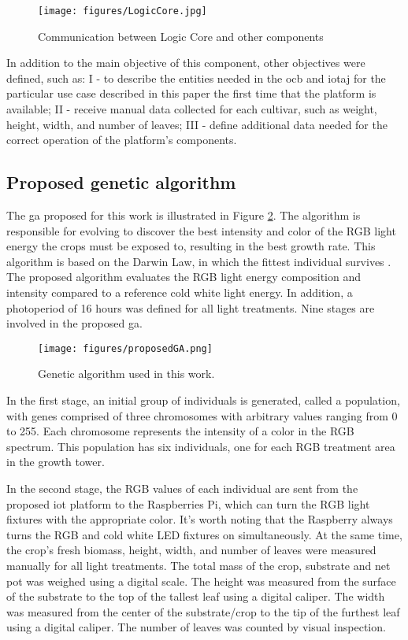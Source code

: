 \documentclass[preprint, review, 12pt]{elsarticle}
\begin{document}
\begin{figure}[htbp]
    \centering
    \texttt{[image: figures/LogicCore.jpg]}
    \caption{Communication between Logic Core and other components}
    \label{fig:logicCore}
\end{figure}

In addition to the main objective of this component, other objectives were defined, such as: I - to describe the entities needed in the \gls{ocb} and \gls{iotaj} for the particular use case described in this paper the first time that the platform is available; II - receive manual data collected for each cultivar, such as weight, height, width, and number of leaves; III - define additional data needed for the correct operation of the platform's components.

\subsection{Proposed genetic algorithm}
\label{sec:geneticAlgorithm}

The \gls{ga} proposed for this work is illustrated in Figure \ref{fig:geneticAlgorithmProposal}. The algorithm is responsible for evolving to discover the best intensity and color of the RGB light energy the crops must be exposed to, resulting in the best growth rate. This algorithm is based on the Darwin Law, in which the fittest individual survives \cite{coello2007}. The proposed algorithm evaluates the RGB light energy composition and intensity compared to a reference cold white light energy. In addition, a photoperiod of 16 hours was defined for all light treatments. Nine stages are involved in the proposed \gls{ga}. 

\begin{figure}[htbp]
    \centering
    \texttt{[image: figures/proposedGA.png]}
    \caption{Genetic algorithm used in this work.}
    \label{fig:geneticAlgorithmProposal}
\end{figure}

In the first stage, an initial group of individuals is generated, called a population, with genes comprised of three chromosomes with arbitrary values ranging from 0 to 255. Each chromosome represents the intensity of a color in the RGB spectrum. This population has six individuals, one for each RGB treatment area in the growth tower. 

In the second stage, the RGB values of each individual are sent from the proposed \gls{iot} platform to the Raspberries Pi, which can turn the RGB light fixtures with the appropriate color. It's worth noting that the Raspberry always turns the RGB and cold white LED fixtures on simultaneously. At the same time, the crop's fresh biomass, height, width, and number of leaves were measured manually for all light treatments. The total mass of the crop, substrate and net pot was weighed using a digital scale. The height was measured from the surface of the substrate to the top of the tallest leaf using a digital caliper. The width was measured from the center of the substrate/crop to the tip of the furthest leaf using a digital caliper. The number of leaves was counted by visual inspection.
\end{document}
